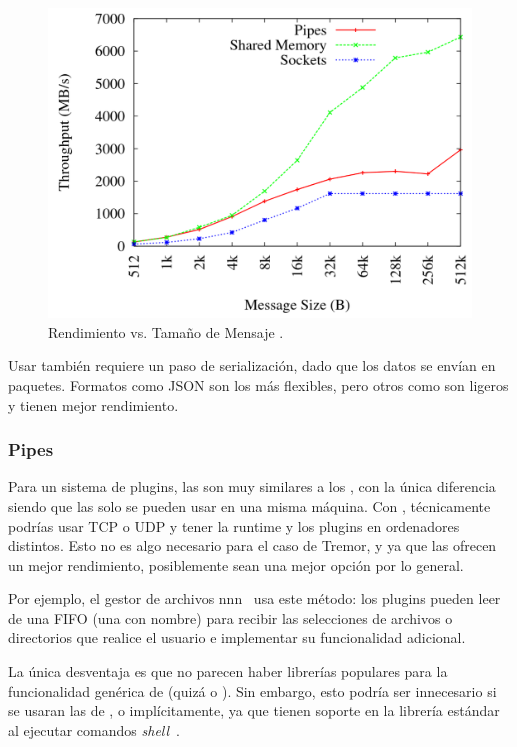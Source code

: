 \begin{figure}
    \centering
    \includegraphics[width=12cm]{./Imagenes/venkataraman2015evaluation2.png}
    \caption{Rendimiento vs. Tamaño de Mensaje
    \cite{venkataraman2015evaluation}.}%
    \label{fig:ipc_comparison2}
\end{figure}

Usar \sockets también requiere un paso de serialización, dado que los datos se
envían en paquetes. Formatos como JSON son los más flexibles, pero otros como
 son ligeros y tienen mejor rendimiento.

\subsubsection{Pipes}

Para un sistema de plugins, las \pipes son muy similares a los \sockets, con la
única diferencia siendo que las \pipes solo se pueden usar en una misma máquina.
Con \sockets, técnicamente podrías usar TCP o UDP y tener la runtime y los
plugins en ordenadores distintos. Esto no es algo necesario para el caso de
Tremor, y ya que las \pipes ofrecen un mejor rendimiento, posiblemente sean una
mejor opción por lo general.

Por ejemplo, el gestor de archivos nnn~\cite{nnn} usa este método: los plugins
pueden leer de una FIFO (una \pipe con nombre) para recibir las selecciones de
archivos o directorios que realice el usuario e implementar su funcionalidad
adicional.

La única desventaja es que no parecen haber librerías populares para la
funcionalidad genérica de \pipes (quizá  o
). Sin embargo, esto podría ser innecesario si se usaran las
\pipes de \stdin, \stdout o \stderr implícitamente, ya que tienen soporte en la
librería estándar al ejecutar comandos \emph{shell}~\cite{rustpipes}.


